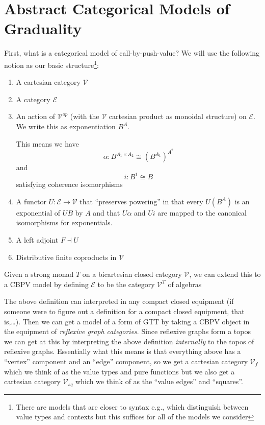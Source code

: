 \section{Abstract Categorical Models of Graduality}

First, what is a categorical model of call-by-push-value? We will use
the following notion as our basic structure\footnote{There are models
that are closer to syntax e.g., which distinguish between value types
and contexts but this suffices for all of the models we consider}:
\begin{enumerate}
\item A cartesian category $\mathcal V$
\item A category $\mathcal E$
\item An action of $\mathcal V^{op}$ (with the $\mathcal V$ cartesian
  product as monoidal structure) on $\mathcal E$. We write this as
  exponentiation $B^A$.

  This means we have 
  \[ \alpha : B^{A_1 \times A_2} \cong (B^{A_1})^{A^2} \]
  and
  \[ i : B^1 \cong B \]
  satisfying coherence isomorphisms
\item A functor $U : \mathcal E \to \mathcal V$ that ``preserves
  powering'' in that every $U(B^A)$ is an exponential of $UB$ by $A$
  and that $U\alpha$ and $Ui$ are mapped to the canonical isomorphisms
  for exponentials.
\item A left adjoint $F \dashv U$
\item Distributive finite coproducts in $\mathcal V$
\end{enumerate}

\begin{example}
  Given a strong monad $T$ on a bicartesian closed category $\mathcal
  V$, we can extend this to a CBPV model by defining $\mathcal E$ to
  be the category $\mathcal V^T$ of algebras
\end{example}

The above definition can interpreted in any compact closed equipment
(if someone were to figure out a definition for a compact closed
equipment, that is,\ldots). Then we can get a model of a form of GTT
by taking a CBPV object in the equipment of \emph{reflexive graph
categories}. Since reflexive graphs form a topos we can get at this by
interpreting the above definition \emph{internally} to the topos of
reflexive graphs. Essentially what this means is that everything above
has a ``vertex'' component and an ``edge'' component, so we get a
cartesian category $\mathcal V_f$ which we think of as the value types
and pure functions but we also get a cartesian category $\mathcal V_{sq}$
which we think of as the ``value edges'' and ``squares''.

